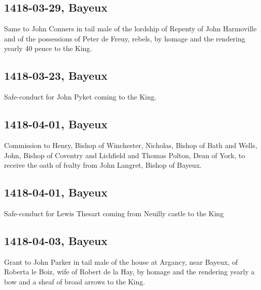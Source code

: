 \documentclass[a4paper,12pt,twoside]{book}
\begin{document}
                
                \subsection{1418-03-29, Bayeux}
                
                
                  Same to John Conners in tail male of the lordship of Repenty of John Harmoville and of the possessions of Peter de Freuy, rebels, by homage and the rendering yearly 40 pence to the King.
               
                
                \subsection{1418-03-23, Bayeux}
                
                
                  Safe-conduct for John Pyket coming to the King.
               
                
                \subsection{1418-04-01, Bayeux}
                
                
                  Commission to Henry, Bishop of Winchester, Nicholas, Bishop of Bath and Wells, John, Bishop of Coventry and Lichfield and Thomas Polton, Dean of York, to receive the oath of fealty from John Langret, Bishop of Bayeux.
               
                
                \subsection{1418-04-01, Bayeux}
                
                
                  Safe-conduct for Lewis Thesart coming from Neuilly castle to the King
               
                
                \subsection{1418-04-03, Bayeux}
                
                
                  Grant to John Parker in tail male of the house at Argancy, near Bayeux, of Roberta le Boiz, wife of Robert de la Hay, by homage and the rendering yearly a bow and a sheaf of broad arrows to the King.
               
\end{document}
